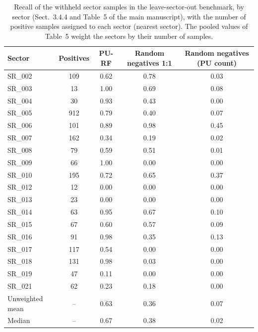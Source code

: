 \begin{table}[!htb]
\caption{Recall of the withheld sector samples in the leave-sector-out benchmark, by sector (Sect.~3.4.4 and Table~5 of the main manuscript), with the number of positive samples assigned to each sector (nearest sector). The pooled values of Table~5 weight the sectors by their number of samples.}\label{tab:S7}
\footnotesize
\begin{tabular*}{\textwidth}{@{\extracolsep{\fill}}lcccc@{}}
\toprule
Sector & Positives & PU-RF & Random negatives 1:1 & Random negatives (PU count) \\
\midrule
SR\_002 & 109 & 0.62 & 0.78 & 0.03 \\
SR\_003 & 13 & 1.00 & 0.69 & 0.08 \\
SR\_004 & 30 & 0.93 & 0.43 & 0.00 \\
SR\_005 & 912 & 0.79 & 0.40 & 0.07 \\
SR\_006 & 101 & 0.89 & 0.98 & 0.45 \\
SR\_007 & 162 & 0.34 & 0.19 & 0.02 \\
SR\_008 & 79 & 0.59 & 0.51 & 0.01 \\
SR\_009 & 66 & 1.00 & 0.00 & 0.00 \\
SR\_010 & 195 & 0.72 & 0.65 & 0.37 \\
SR\_012 & 12 & 0.00 & 0.00 & 0.00 \\
SR\_013 & 23 & 0.00 & 0.00 & 0.00 \\
SR\_014 & 63 & 0.95 & 0.67 & 0.10 \\
SR\_015 & 67 & 0.60 & 0.57 & 0.09 \\
SR\_016 & 91 & 0.98 & 0.35 & 0.13 \\
SR\_017 & 117 & 0.54 & 0.00 & 0.00 \\
SR\_018 & 131 & 0.98 & 0.03 & 0.00 \\
SR\_019 & 47 & 0.11 & 0.00 & 0.00 \\
SR\_021 & 62 & 0.23 & 0.18 & 0.00 \\
\midrule
Unweighted mean & -- & 0.63 & 0.36 & 0.07 \\
Median & -- & 0.67 & 0.38 & 0.02 \\
\bottomrule
\end{tabular*}
\end{table}
